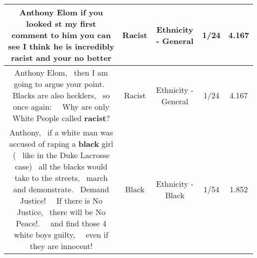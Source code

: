 \documentclass[11pt]{article}
\newlength\mylength
\begin{document}
\begin{center}
\begin{longtable}{|C{.65\mylength}|C{.30\mylength}|C{.12\mylength}|C{.12\mylength}|C{.12\mylength}|}
  \small Anthony Elom if you looked st my first comment to him you can see I think he is incredibly \textbf{racist} and your no better\normalsize   & Racist & Ethnicity - General & 1/24 & 4.167 \\  \hline
  \small Anthony Elom,  then I am going to argue your point.  Blacks are also hecklers,  so once again:   Why are only White People called \textbf{racist}?\normalsize   & Racist & Ethnicity - General & 1/24 & 4.167 \\  \hline
  \small Anthony,  if a white man was accused of raping a \textbf{black} girl (  like in the Duke Lacrosse case)  all the blacks would take to the streets,  march and demonstrate.  Demand Justice!   If there is No Justice,  there will be No Peace!.   and find those 4 white boys guilty,   even if they are innocent!\normalsize   & Black & Ethnicity - Black & 1/54 & 1.852 \\  \hline
  
\end{longtable}
\end{center}
\end{document}
